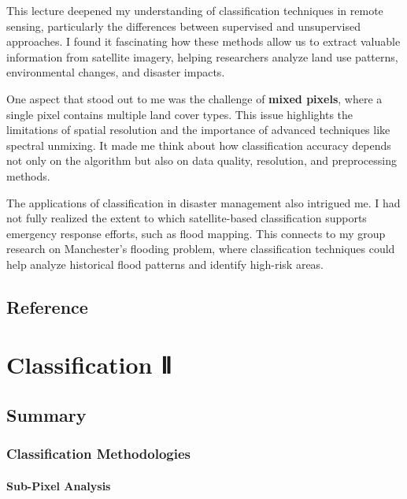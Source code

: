 \documentclass[
  letterpaper,
]{scrbook}
\begin{document}
This lecture deepened my understanding of classification techniques in
remote sensing, particularly the differences between supervised and
unsupervised approaches. I found it fascinating how these methods allow
us to extract valuable information from satellite imagery, helping
researchers analyze land use patterns, environmental changes, and
disaster impacts.

One aspect that stood out to me was the challenge of \textbf{mixed
pixels}, where a single pixel contains multiple land cover types. This
issue highlights the limitations of spatial resolution and the
importance of advanced techniques like spectral unmixing. It made me
think about how classification accuracy depends not only on the
algorithm but also on data quality, resolution, and preprocessing
methods.

The applications of classification in disaster management also intrigued
me. I had not fully realized the extent to which satellite-based
classification supports emergency response efforts, such as flood
mapping. This connects to my group research on Manchester's flooding
problem, where classification techniques could help analyze historical
flood patterns and identify high-risk areas.

\section{Reference}\label{reference-4}


\chapter{Classification Ⅱ}\label{classification-ux2171}

\section{Summary}\label{summary-4}

\subsection{Classification
Methodologies}\label{classification-methodologies}

\subsubsection{Sub-Pixel Analysis}\label{sub-pixel-analysis}
\end{document}
